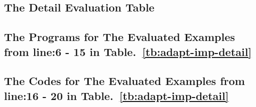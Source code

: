 \subsection{The Detail Evaluation Table}
\label{apdx:eval_table}

\subsection{The Programs for The Evaluated Examples from line:6 - 15 in Table.~\ref{tb:adapt-imp-detail}}
\label{apdx:evaluated_examples}

\subsection{The Codes for The Evaluated  Examples from line:16 - 20 in Table.~\ref{tb:adapt-imp-detail}}
\label{apdx:evaluated_codes}


% 